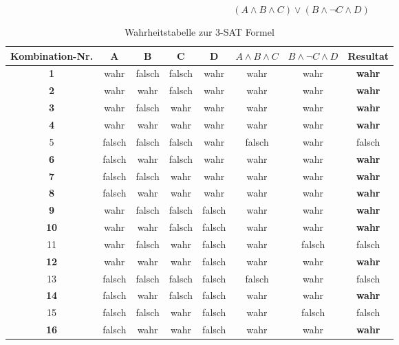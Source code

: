 	\begin{equation}
   		(A \wedge B \wedge C) \vee (B \wedge \neg C \wedge D)
  		 \label{eq:aussagenlogik_3sat}
	\end{equation}

\begin{table}[ht]
\centering
  \begin{tabular}{ c | c | c | c | c | c | c | c}
	\hline
	\rowcolor{gray}
	\textbf{Kombination-Nr.}	& \textbf{A}	& \textbf{B} 	& \textbf{C} & \textbf{D}  & $A \wedge B \wedge C$ & $B \wedge \neg C \wedge D$	& \textbf{Resultat}\\ \hline
	\textbf{1}			& wahr	& falsch	& falsch	& wahr	& wahr			 & wahr				& \textbf{wahr}\\ \hline
	\textbf{2}			& wahr	& wahr	& falsch	& wahr	& wahr			 & wahr 				& \textbf{wahr}\\ \hline
	\textbf{3}			& wahr	& falsch	& wahr	& wahr	& wahr			 & wahr				& \textbf{wahr}\\ \hline
	\textbf{4}			& wahr	& wahr	& wahr	& wahr	& wahr			 & wahr				& \textbf{wahr}\\ \hline
	5				& falsch	& falsch	& falsch	& wahr	& falsch			 & wahr				& falsch\\ \hline
	\textbf{6}			& falsch	& wahr	& falsch	& wahr	& wahr			 & wahr				& \textbf{wahr}\\ \hline
	\textbf{7}			& falsch	& falsch	& wahr	& wahr	& wahr			 & wahr 				& \textbf{wahr}\\ \hline
	\textbf{8}			& falsch	& wahr	& wahr	& wahr	& wahr			 & wahr 				& \textbf{wahr}\\ \hline
	\textbf{9}			& wahr	& falsch	& falsch	& falsch	& wahr			 & wahr				& \textbf{wahr}\\ \hline
	\textbf{10}			& wahr	& wahr	& falsch	& falsch	& wahr			 & wahr 				& \textbf{wahr}\\ \hline
	11				& wahr	& falsch	& wahr	& falsch	& wahr			 & falsch				& falsch\\ \hline
	\textbf{12}			& wahr	& wahr	& wahr	& falsch	& wahr			 & wahr				& \textbf{wahr}\\ \hline
	13				& falsch	& falsch	& falsch	& falsch	& falsch			 & wahr				& falsch\\ \hline
	\textbf{14}			& falsch	& wahr	& falsch	& falsch	& wahr			 & wahr				& \textbf{wahr}\\ \hline
	15				& falsch	& falsch	& wahr	& falsch	& wahr			 & falsch 				& falsch\\ \hline
	\textbf{16}			& falsch	& wahr	& wahr	& falsch	& wahr			 & wahr 				& \textbf{wahr}\\ \hline
  \end{tabular}
   \caption{Wahrheitstabelle zur 3-SAT Formel}\label{table:3sat_results}
\end{table}

